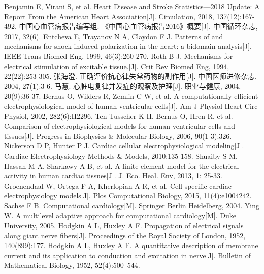 \documentclass[twoside,UTF8]{nputhesis}
\begin{document}
\backmatter

%
\begin{thebibliography}{99}
	\addtolength{\itemsep}{-1.1em} %
	Benjamin E, Virani S, et al. Heart Disease and Stroke Statistics—2018 Update: A Report From the American Heart Association[J]. Circulation, 2018, 137(12):167-492.
	中国心血管病报告编写组. 《中国心血管病报告2016》概要[J]. 中国循环杂志, 2017, 32(6).
	Entcheva E, Trayanov N A, Claydon F J. Patterns of and mechanisms for shock-induced polarization in the heart: a bidomain analysis[J]. IEEE Trans Biomed Eng, 1999, 46(3):260-270.
	Roth B J. Mechanisms for electrical stimulation of excitable tissue.[J]. Crit Rev Biomed Eng, 1994, 22(22):253-305.
	张海澄. 正确评价抗心律失常药物的副作用[J]. 中国医师进修杂志, 2004, 27(1):3-6.
	马慧. 心脏电复律并发症的观察及护理[J]. 职业与健康, 2004, 20(9):36-37.
	Bernus O, Wilders R, Zemlin C W, et al. A computationally efficient electrophysiological model of human ventricular cells[J]. Am J Physiol Heart Circ Physiol, 2002, 282(6):H2296.
	Ten Tusscher K H, Bernus O, Hren R, et al. Comparison of electrophysiological models for human ventricular cells and tissues[J]. Progress in Biophysics \& Molecular Biology, 2006, 90(1-3):326.
	Nickerson D P, Hunter P J. Cardiac cellular electrophysiological modeling[J]. Cardiac Electrophysiology Methods \& Models, 2010:135-158.
	Shuaiby S M, Hassan M A, Sharkawy A B, et al. A finite element model for the electrical activity in human cardiac tissues[J]. J. Eco. Heal. Env, 2013, 1: 25-33.
	Groenendaal W, Ortega F A, Kherlopian A R, et al. Cell-specific cardiac electrophysiology models[J]. Plos Computational Biology, 2015, 11(4):e1004242.
	Sachse F B. Computational cardiology[M]. Springer Berlin Heidelberg, 2004.
	Ying W. A multilevel adaptive approach for computational cardiology[M]. Duke University, 2005.
	Hodgkin A L, Huxley A F. Propagation of electrical signals along giant nerve fibers[J]. Proceedings of the Royal Society of London, 1952, 140(899):177.
	Hodgkin A L, Huxley A F. A quantitative description of membrane current and its application to conduction and excitation in nerve[J]. Bulletin of Mathematical Biology, 1952, 52(4):500–544.

\end{thebibliography}
\end{document}
